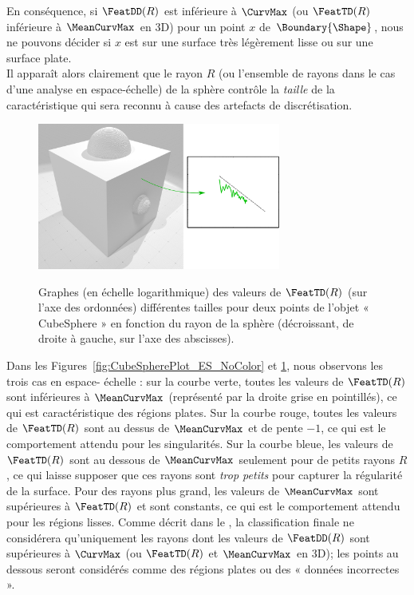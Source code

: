 %
En conséquence, si $\FeatDD(R)$ est inférieure à $\CurvMax$ (ou $\FeatTD(R)$
inférieure à $\MeanCurvMax$ en 3D) pour un point $x$ de $\Boundary{\Shape}$,
nous ne pouvons décider si $x$ est sur une surface très légèrement lisse ou sur
une surface plate.
%
\\
%
Il apparaît alors clairement que le rayon $R$ (ou l'ensemble de rayons dans le
cas d'une analyse en espace-échelle) de la sphère contrôle la \emph{taille} de
la caractéristique qui sera reconnu à cause des artefacts de discrétisation.
%
\begin{figure}[ht]
\begin{center}
  {\includegraphics[width=8cm]{figures/CubeSpherePlot_F_NoColor}}
  \caption{Graphes (en échelle logarithmique) des valeurs de $\FeatTD(R)$ (sur
  l'axe des ordonnées) différentes tailles pour deux points de l'objet «
  CubeSphere » en fonction du rayon de la sphère (décroissant, de droite
  à gauche, sur l'axe des abscisses).\label{fig:CubeSpherePlot_F_NoColor}}
\end{center}
\end{figure}
%
Dans les Figures~\ref{fig:CubeSpherePlot_ES_NoColor} et
\ref{fig:CubeSpherePlot_F_NoColor}, nous observons les trois cas en espace-
échelle : sur la courbe verte, toutes les valeurs de $\FeatTD(R)$ sont
inférieures à $\MeanCurvMax$ (représenté par la droite grise en pointillés), ce
qui est caractéristique des régions plates. Sur la courbe rouge, toutes les
valeurs de $\FeatTD(R)$ sont au dessus de $\MeanCurvMax$ et de pente $-1$, ce
qui est le comportement attendu pour les singularités. Sur la courbe bleue, les
valeurs de $\FeatTD(R)$ sont au dessous de $\MeanCurvMax$ seulement pour de
petits rayons $R$, ce qui laisse supposer que ces rayons sont \emph{trop petits}
pour capturer la régularité de la surface. Pour des rayons plus grand, les
valeurs de $\MeanCurvMax$ sont supérieures à $\FeatTD(R)$ et sont constants, ce
qui est le comportement attendu pour les régions lisses. Comme décrit dans le
, la classification
finale ne considérera qu'uniquement les rayons dont les valeurs de $\FeatDD(R)$
sont supérieures à $\CurvMax$ (ou $\FeatTD(R)$ et $\MeanCurvMax$ en 3D); les
points au dessous seront considérés comme des régions plates ou des « données
incorrectes ».
%

